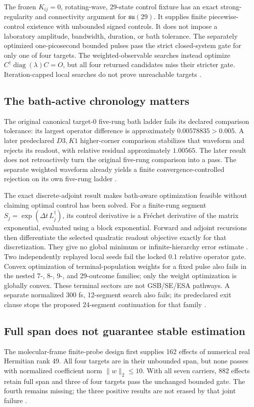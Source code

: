 \documentclass[11pt]{article}
\theoremstyle{definition}
\theoremstyle{remark}
\begin{document}
The frozen \(K_{ij}=0\), rotating-wave, 29-state control fixture has an
exact strong-regularity and connectivity argument for \(\mathfrak{su}(29)\).
It supplies finite piecewise-control existence with unbounded signed
controls. It does not impose a laboratory amplitude, bandwidth, duration,
or bath tolerance. The separately optimized one-picosecond bounded pulses
pass the strict closed-system gate for only one of four targets. The
weighted-observable searches instead optimize
\(C^\dagger\operatorname{diag}(\lambda)C=O\), but all four returned
candidates miss their stricter gate. Iteration-capped local searches do
not prove unreachable targets \cite{beq09,beq10,beq11}.

\subsection{The bath-active chronology matters}\label{sec:bath-chronology}
The original canonical target-0 five-rung bath ladder fails its declared
comparison tolerance: its largest operator difference is approximately
\(0.00578835>0.005\). A later predeclared \(D3,K1\) higher-corner
comparison stabilizes that waveform and rejects its readout, with relative
residual approximately \(1.00565\). The later result does not retroactively
turn the original five-rung comparison into a pass. The separate weighted
waveform already yields a finite convergence-controlled rejection on its
own five-rung ladder \cite{beq12,beq13,beq15}.

The exact discrete-adjoint result makes bath-aware optimization feasible
without claiming optimal control has been solved. For a finite-rung
segment \(S_j=\exp(\Delta t\,L_j^\dagger)\), its control derivative is a
Fr\'echet derivative of the matrix exponential, evaluated using a block
exponential. Forward and adjoint recursions then differentiate the selected
quadratic readout objective exactly for that discretization. They give no
global minimum or infinite-hierarchy error estimate \cite{beq14}.
Two independently replayed local seeds fail the locked 0.1 relative
operator gate. Convex optimization of terminal-population weights for a
fixed pulse also fails in the nested 7-, 8-, 9-, and 29-outcome families;
only the weight optimization is globally convex. These terminal sectors
are not GSB/SE/ESA pathways. A separate normalized 300 fs, 12-segment search
also fails; its predeclared exit clause stops the proposed 24-segment
continuation for that family \cite{beq16,beq17,beq18}.

\subsection{Full span does not guarantee stable estimation}
\label{sec:bounded-probe}
The molecular-frame finite-probe design first supplies 162 effects of
numerical real Hermitian rank 49. All four targets are in their unbounded
span, but none passes with normalized coefficient norm \(\|w\|_2\leq10\).
With all seven carriers, 882 effects retain full span and three of four
targets pass the unchanged bounded gate. The fourth remains missing; the
three positive results are not erased by that joint failure
\cite{beq19,beq20}.
\end{document}
